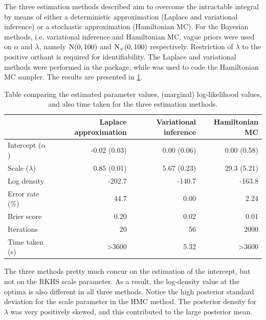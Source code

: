 The three estimation methods described aim to overcome the intractable integral by means of either a deterministic approximation (Laplace and variational inference) or a stochastic approximation (Hamiltonian MC).
For the Bayesian methods, i.e. variational inference and Hamiltonian MC, vague priors were used on $\alpha$ and $\lambda$, namely $\operatorname{N}(0,100)$ and $\operatorname{N}_+(0,100)$ respectively.
Restriction of $\lambda$ to the positive orthant is required for identifiability.
The Laplace and variational methods were performed in the  package, while  was used to code the Hamiltonian MC sampler.
The results are presented in \cref{tab:compreiprobit}.

\begin{table}[hbt]
\centering
\caption{Table comparing the estimated parameter values, (marginal) log-likelihood values, and also time taken for the three estimation methods.}
\label{tab:compreiprobit}
\begin{tabular}{@{}lrrr@{}}
\toprule
& Laplace approximation 
& Variational inference 
& Hamiltonian MC          \\ \midrule
Intercept ($\alpha$)      & -0.02 (0.03)           & 0.00 (0.06)    & 0.00 (0.58)  \\
Scale ($\lambda$)      & 0.85 (0.01)         & 5.67 (0.23)  & 29.3 (5.21)     \\[0.5em]
Log density    & -202.7              & -140.7       & -163.8                  \\
Error rate (\%) & 44.7               & 0.00        & 2.24                   \\
Brier score & 0.20               & 0.02        & 0.01                   \\[0.5em]
Iterations     & 20                  & 56          & 2000                    \\
Time taken (s) & >3600                & 5.32         & >3600                     \\ \bottomrule
\end{tabular}
\end{table}

The three methods pretty much concur on the estimation of the intercept, but not on the RKHS scale parameter.
As a result, the log-density value at the optima is also different in all three methods.
Notice the high posterior standard deviation for the scale parameter in the HMC method.
The posterior density for $\lambda$ was very positively skewed, and this contributed to the large posterior mean.


